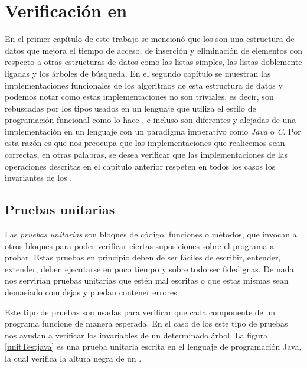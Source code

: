 \chapter{Verificación en {\coq}}

En el primer cap\'itulo de este trabajo se mencion\'o que los {\arns} son una estructura de datos
que mejora el tiempo de acceso, de inserción y eliminación de elementos con respecto a otras
estructuras de datos como las listas simples, las listas doblemente ligadas y los \'arboles de
búsqueda. En el segundo cap\'itulo se muestran las implementaciones funcionales de los algoritmos de esta
estructura de datos y podemos notar como estas implementaciones no son triviales, es decir, son
rebuscadas por los tipos usados en un lenguaje que utiliza el estilo de programaci\'on funcional como
lo hace {\coq}, e incluso son diferentes y alejadas de una implementaci\'on en un lenguaje con un paradigma imperativo como \textit{Java} o \textit{C}.
Por esta razón es que nos preocupa que las implementaciones que realicemos sean correctas, en otras palabras, se desea verificar que las implementaciones de las operaciones
descritas en el capitulo anterior respeten en todos los casos los invariantes de los {\arns}.

\section{Pruebas unitarias}
Las \textit{pruebas unitarias} \cite{unittest} son bloques de c\'odigo, funciones o m\'etodos, que
invocan a otros bloques para poder verificar ciertas suposiciones sobre el programa a probar. Estas
pruebas en principio deben de ser fáciles de escribir, entender, extender, deben ejecutarse en poco
tiempo y sobre todo ser fidedignas. De nada nos servirían pruebas unitarias que estén mal
escritas o que estas mismas sean demasiado complejas y puedan contener errores.

Este tipo de pruebas son usadas para verificar que cada componente de un programa funcione de
manera esperada. En el caso de los {\arns} este tipo de pruebas nos ayudan a verificar los
invariables de un determinado \'arbol. La figura \ref{unitTestjava} es una prueba unitaria
escrita en el lenguaje de programaci\'on Java, la cual verifica la altura negra de un {\arn} \cite{CanekPU}.

